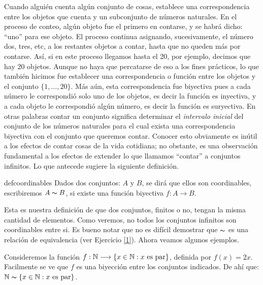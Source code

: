  Cuando
alguién cuenta algún conjunto de cosas, establece una
correspondencia entre los objetos que cuenta y un subconjunto de
números naturales. En el proceso de conteo,
algún objeto fue el primero en contarse, y se habrá dicho:
``uno'' para ese objeto. El proceso continua asignando,
sucesivamente, el número dos, tres, etc, a los restantes objetos
a contar, hasta que no queden más por contarse. Así, si en
este proceso llegamos hasta el 20, por ejemplo, decimos que hay 20
objetos. Aunque no haya que percatarse de eso a los fines
prácticos, lo que también hicimos fue establecer una
correspondencia o función entre los objetos y el conjunto
$\{1,\dots,20\}$. Más aún, esta correspondencia fue biyectiva
pues a cada número le correspondió solo uno de los objetos, es decir la función es inyectiva, y a cada objeto le
correspondió algún número, es decir  la función es
suryectiva. En otras palabras contar un conjunto significa
determinar el  \emph{intervalo inicial} del conjunto de los
números naturales para el cual exista una correspondencia biyectiva
con el conjunto que queremos contar. Conocer esto obviamente es
inútil a los efectos de contar cosas de la vida cotidiana;
no obstante, es una observación fundamental a los efectos de
extender lo que llamamos ``contar'' a conjuntos infinitos. Lo que
antecede sugiere la siguiente definición.

\begin{definicion}{defcoordinables} Dados dos conjuntos: $A$ y $B$,
se dirá que ellos son coordinables, escribiremos $A\thicksim B$,
si existe una función biyectiva $f:A\longrightarrow B$.
\end{definicion}

Esta es nuestra definición de que dos conjuntos, finitos o
no, tengan la misma cantidad de elementos. Como veremos, no
todos los  conjuntos infinitos son coordinables entre si. 
Es bueno notar que no es difícil demostrar que $\thicksim$ es
una relación de equivalencia (ver Ejercicio \vref{1}).
 Ahora
veamos algunos ejemplos.

\begin{ejemplo}{}Consideremos la función
$f:\mathbb{N}\longrightarrow\{x\in\mathbb{N}:x\,\,\text{es par}\}$, definida por
$f(x)=2x$. Facilmente se ve que $f$ es una biyección entre los
conjuntos indicados. De ahí que:
$\mathbb{N}\thicksim\{x\in\mathbb{N}:x\,\,\text{es par}\}$.
\end{ejemplo}

